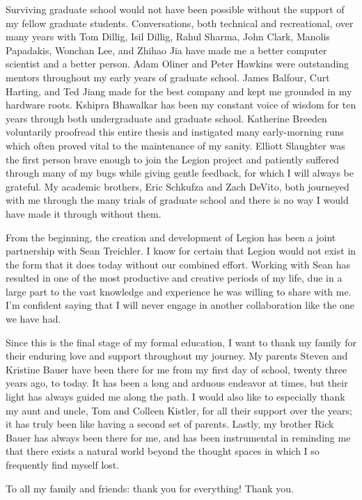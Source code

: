 Surviving graduate school would not have been possible 
without the support of my fellow graduate students. Conversations,
both technical and recreational, over many years with Tom Dillig, 
Isil Dillig, Rahul Sharma, John Clark, Manolis Papadakis, 
Wonchan Lee, and Zhihao Jia have made me a better computer scientist
and a better person. Adam Oliner and Peter Hawkins were outstanding 
mentors throughout my early years of graduate school. James Balfour, 
Curt Harting, and Ted Jiang made for the best company and kept me grounded 
in my hardware roots. Kshipra Bhawalkar has been my constant
voice of wisdom for ten years through both undergraduate and graduate school.
Katherine Breeden voluntarily proofread this entire thesis and instigated 
many early-morning runs which often proved vital to the maintenance
of my sanity. Elliott Slaughter was the first person brave
enough to join the Legion project and patiently suffered through
many of my bugs while giving gentle feedback, for which I will
always be grateful. My academic brothers, Eric Schkufza and Zach DeVito,
both journeyed with me through the many trials of graduate school
and there is no way I would have made it through without them.

From the beginning, the creation and development of Legion has been
a joint partnership with Sean Treichler. I know for certain that 
Legion would not exist in the form that it does today without our 
combined effort. Working with Sean has resulted in one of the most
productive and creative periods of my life, due in a large part to the 
vast knowledge and experience he was willing to share with me. I'm
confident saying that I will never engage in another collaboration 
like the one we have had.

Since this is the final stage of my formal education, I want to thank
my family for their enduring love and support throughout my 
journey. My parents Steven and Kristine Bauer have been there 
for me from my first day of school, twenty three years ago, to today. 
It has been a long and arduous endeavor at times, but their light 
has always guided me along the path. I would also like to especially
thank my aunt and uncle, 
Tom and Colleen Kistler, for all their support over the years; it
has truly been like having a second set of parents. Lastly, my
brother Rick Bauer has always been there for me, and has been
instrumental in reminding me that there exists a natural world 
beyond the thought spaces in which I so frequently find myself lost.

To all my family and friends: thank you for everything! Thank you.

\afterpreface
